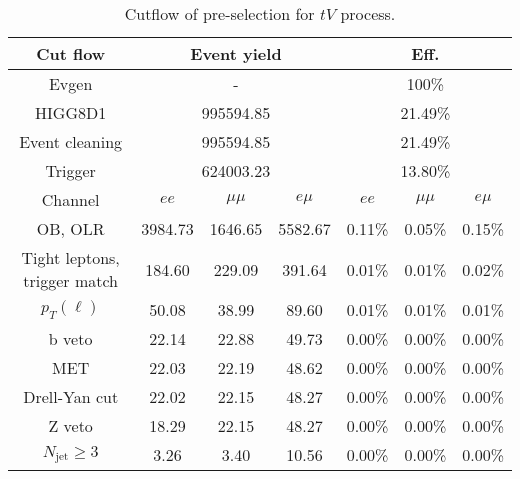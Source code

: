 \begin{table}
\centering\small
\begin{tabular}{c|ccc|ccc}
\hline
\hline
Cut flow &\multicolumn{3}{c|}{Event yield}&\multicolumn{3}{c}{Eff.}      \\
\hline
Evgen&\multicolumn{3}{c|}{-}&\multicolumn{3}{c}{100\%}\\
HIGG8D1&\multicolumn{3}{c|}{995594.85}&\multicolumn{3}{c}{21.49\%}\\
Event cleaning&\multicolumn{3}{c|}{995594.85}&\multicolumn{3}{c}{21.49\%}\\
Trigger&\multicolumn{3}{c|}{624003.23    }&\multicolumn{3}{c}{13.80\%}\\
Channel&$ee$&$\mu\mu$&$e\mu$&$ee$&$\mu\mu$&$e\mu$\\
\hline
OB, OLR    &3984.73    &1646.65    &5582.67& 0.11\%    &0.05\%    &0.15\%\\
Tight leptons, trigger match    &184.60    &229.09    &391.64    &0.01\%    &0.01\%    &0.02\%\\
$p_T(\ell)$    &50.08    &38.99    &89.60    &0.01\%    &0.01\%    &0.01\%\\
b veto    &22.14    &22.88    &49.73    &0.00\%    &0.00\%    &0.00\%\\
MET    &22.03    &22.19    &48.62    &0.00\%    &0.00\%    &0.00\%\\
Drell-Yan cut    &22.02    &22.15    &48.27    &0.00\%    &0.00\%    &0.00\%\\
Z veto    &18.29    &22.15    &48.27    &0.00\%    &0.00\%    &0.00\%\\
$N_{\text{jet}}\geq3$    &3.26    &3.40    &10.56    &0.00\%    &0.00\%    &0.00\%\\
\hline
\hline
\end{tabular}
\caption{Cutflow of pre-selection for $tV$ process.}
\label{tab:cut_flow_preselection_tV}
\end{table}
